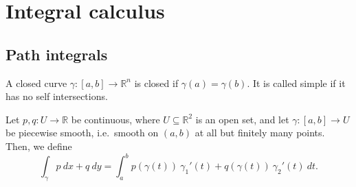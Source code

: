 \documentclass[11pt]{article}
\newcommand{\R}{\mathbb{R}}
\theoremstyle{definition}
\theoremstyle{remark}
\numberwithin{equation}{section}
\begin{document}
    \section{Integral calculus}
    
    \subsection{Path integrals}
    
    \begin{definition}
        A closed curve $\gamma\colon [a, b] \to \R^n$ is closed if $\gamma(a) =
        \gamma(b)$. It is called simple if it has no self intersections.
    \end{definition}
    
    \begin{definition}
        Let $p, q\colon U \to \R$ be continuous, where $U \subseteq \R^2$ is an open
        set, and let $\gamma \colon [a, b] \to U$ be piecewise smooth, i.e.\ smooth
        on $(a, b)$ at all but finitely many points. Then, we define \[
            \int_\gamma p\:dx + q\:dy = \int_a^b p(\gamma(t))\:\gamma_1'(t) +
            q(\gamma(t)) \:\gamma_2'(t) \:dt.
        \] 
    \end{definition}
\end{document}
